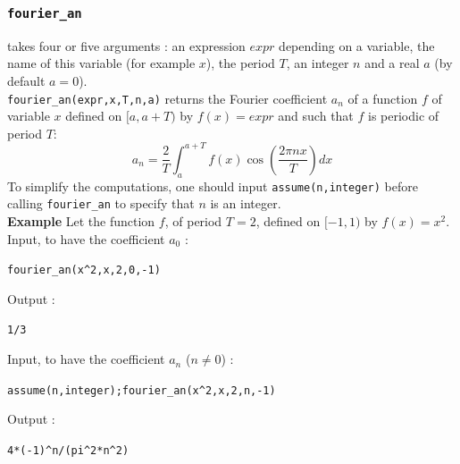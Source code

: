\documentclass[a4paper,11pt]{book}
\begin{document}
\subsubsection{\tt fourier\_an}\label{sec:fourier_an}
 takes four or five arguments : an expression $expr$
depending on a variable, the name of this variable (for example $x$), the 
period $T$, an integer $n$ and a real $a$ (by default $a=0$).\\
{\tt fourier\_an(expr,x,T,n,a)} returns the Fourier coefficient $a_n$ of a 
function $f$ of 
variable $x$ defined on $[a,a+T)$ by $f(x)=expr$ and such that
$f$ is periodic of period $T$:
$$\displaystyle a_n=\frac{2}{T}\int_a^{a+T}f(x)\cos(\frac{2\pi nx }{T})dx$$
To simplify the computations, one should input {\tt assume(n,integer)} 
before calling {\tt fourier\_an} to specify 
that $n$ is an integer.\\
{\bf Example} Let the function $f$, of period $T=2$, defined on $[-1,1)$ by 
$f(x)=x^2$.\\
Input, to have the coefficient $a_0$ :
\begin{center}{\tt fourier\_an(x\verb|^|2,x,2,0,-1)}\end{center}
Output :
\begin{center}{\tt 1/3}\end{center}
Input, to have the coefficient $a_n$ ($n\neq 0$) :
 \begin{center}{\tt assume(n,integer);fourier\_an(x\verb|^|2,x,2,n,-1)}\end{center}
Output :
\begin{center}{\tt 4*(-1)\verb|^|n/(pi\verb|^|2*n\verb|^|2)}\end{center}
\end{document}
